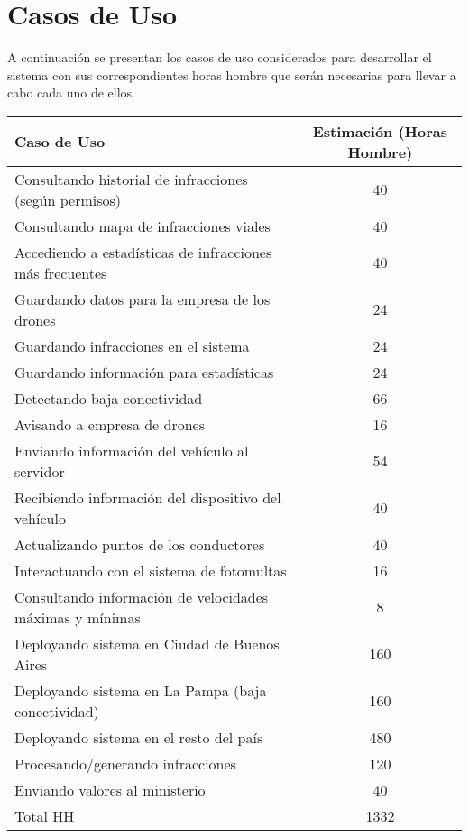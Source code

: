\section{Casos de Uso}

A continuación se presentan los casos de uso considerados para desarrollar el sistema
con sus correspondientes horas hombre que serán necesarias para llevar a cabo 
cada uno de ellos.


\begin{table}[htb]
\begin{center}
\begin{tabular}{|l|c|}
\hline
Caso de Uso & Estimación (Horas Hombre) \\
\hline \hline
Consultando historial de infracciones (según permisos) & 40 \\ \hline
Consultando mapa de infracciones viales & 40 \\ \hline
Accediendo a estadísticas de infracciones más frecuentes & 40 \\ \hline
Guardando datos para la empresa de los drones & 24 \\ \hline
Guardando infracciones en el sistema & 24 \\ \hline
Guardando información para estadísticas & 24 \\ \hline
Detectando baja conectividad & 66 \\ \hline
Avisando a empresa de drones & 16 \\ \hline
Enviando información del vehículo al servidor & 54 \\ \hline
Recibiendo información del dispositivo del vehículo & 40 \\ \hline
Actualizando puntos de los conductores & 40 \\ \hline
Interactuando con el sistema de fotomultas & 16 \\ \hline
Consultando información de velocidades máximas y mínimas & 8 \\ \hline
Deployando sistema en Ciudad de Buenos Aires & 160 \\ \hline
Deployando sistema en La Pampa (baja conectividad) & 160 \\ \hline
Deployando sistema en el resto del país & 480 \\ \hline
Procesando/generando infracciones & 120 \\ \hline
Enviando valores al ministerio & 40 \\ \hline \hline
Total HH & 1332 \\ \hline
\end{tabular}
\end{center}
\end{table}
